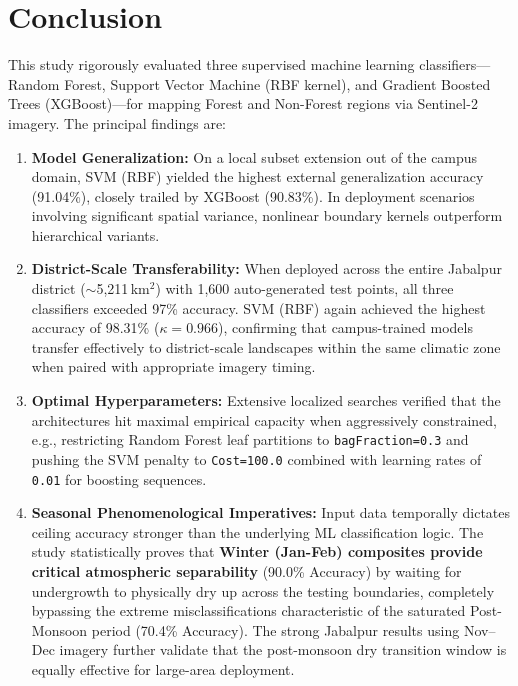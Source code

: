 \documentclass[12pt, a4paper, twocolumn]{article}
\begin{document}
\section{Conclusion}
\label{sec:conclusion}

This study rigorously evaluated three supervised machine learning classifiers---Random Forest, Support Vector Machine (RBF kernel), and Gradient Boosted Trees (XGBoost)---for mapping Forest and Non-Forest regions via Sentinel-2 imagery. The principal findings are:

\begin{enumerate}
    \item \textbf{Model Generalization:} On a local subset extension out of the campus domain, SVM (RBF) yielded the highest external generalization accuracy (91.04\%), closely trailed by XGBoost (90.83\%). In deployment scenarios involving significant spatial variance, nonlinear boundary kernels outperform hierarchical variants.
    
    \item \textbf{District-Scale Transferability:} When deployed across the entire Jabalpur district ($\sim$5,211\,km$^2$) with 1,600 auto-generated test points, all three classifiers exceeded 97\% accuracy. SVM (RBF) again achieved the highest accuracy of 98.31\% ($\kappa = 0.966$), confirming that campus-trained models transfer effectively to district-scale landscapes within the same climatic zone when paired with appropriate imagery timing.
    
    \item \textbf{Optimal Hyperparameters:} Extensive localized searches verified that the architectures hit maximal empirical capacity when aggressively constrained, e.g., restricting Random Forest leaf partitions to \texttt{bagFraction=0.3} and pushing the SVM penalty to \texttt{Cost=100.0} combined with learning rates of \texttt{0.01} for boosting sequences.
    
    \item \textbf{Seasonal Phenomenological Imperatives:} Input data temporally dictates ceiling accuracy stronger than the underlying ML classification logic. The study statistically proves that \textbf{Winter (Jan-Feb) composites provide critical atmospheric separability} (90.0\% Accuracy) by waiting for undergrowth to physically dry up across the testing boundaries, completely bypassing the extreme misclassifications characteristic of the saturated Post-Monsoon period (70.4\% Accuracy). The strong Jabalpur results using Nov--Dec imagery further validate that the post-monsoon dry transition window is equally effective for large-area deployment.
\end{enumerate}
\end{document}
